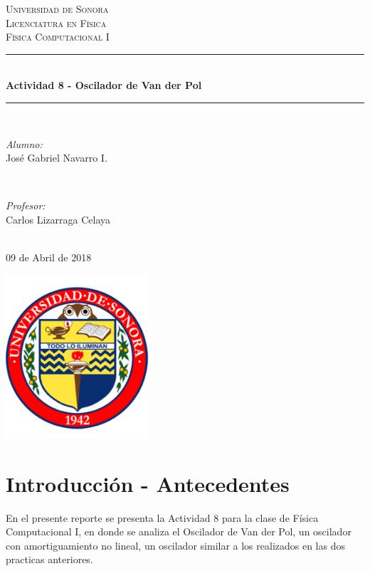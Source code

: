 \documentclass[12pt]{article}
\begin{document}
\begin{titlepage}

\newcommand{\HRule}{\rule{\linewidth}{0.5mm}} 

\center 

\textsc{\LARGE Universidad de Sonora}\\[1.5cm]
\textsc{\Large Licenciatura en Física}\\[0.5cm]
\textsc{\large Física Computacional I}\\[0.5cm]

\HRule \\[0.4cm]
{\huge \bfseries Actividad 8 - Oscilador de Van der Pol}\\[0.4cm] 
\HRule \\[1.5cm]

\begin{minipage}{0.4\textwidth}
\begin{flushleft} \large
\emph{Alumno:}\\
José Gabriel Navarro I.
\end{flushleft}
\end{minipage}
~
\begin{minipage}{0.4\textwidth}
\begin{flushright} \large
\emph{Profesor:} \\
Carlos Lizarraga Celaya
\end{flushright}
\end{minipage}\\[2cm]

09 de Abril de 2018

\includegraphics[width=0.4\textwidth]{logo.png}\\
 
\vfill

\end{titlepage}

\section{Introducción - Antecedentes}
En el presente reporte se presenta la Actividad 8 para la clase de Física Computacional I, en donde se analiza el Oscilador de Van der Pol, un oscilador con amortiguamiento no lineal, un oscilador similar a los realizados en las dos practicas anteriores. \\
\end{document}
